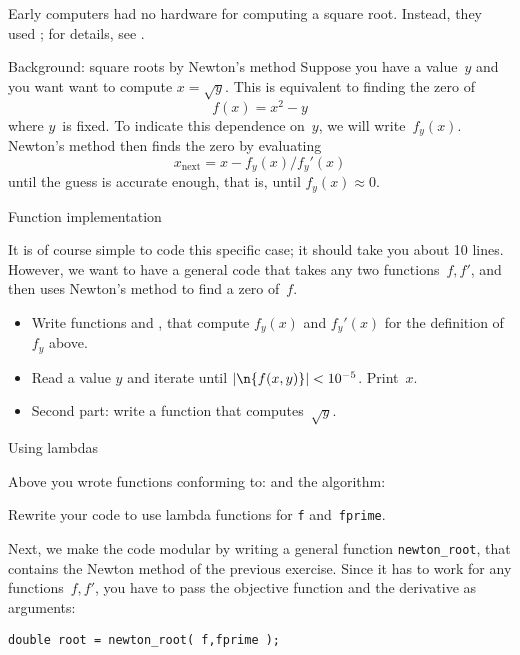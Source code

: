 Early computers had no hardware for computing a square
root. Instead, they used ;
for details, see .

\begin{block}{Background: square roots by Newton's method}
  \label{sl:newton-root}
  Suppose you
  have a value~$y$ and you want want to compute
  $x=\sqrt{y}$. This is equivalent to finding the zero of
  \[ f(x) = x^2-y \] where $y$~is fixed. To indicate this dependence
  on~$y$, we will write~$f_y(x)$. Newton's method then finds the zero by
  evaluating
  \[ x_{\mathrm{next}}=x-f_y(x)/f_y'(x) \]
  until the guess is accurate enough, that is, until $f_y(x)\approx0$.
\end{block}

 {Function implementation}

It is of course simple to code this specific case;
it should take you about 10 lines.
However, we want to have a general code
that takes any two functions~$f,f'$,
and then uses Newton's method to find a zero of~$f$.

\begin{exercise}
  \label{ex:newton-root}
  \begin{itemize}
  \item Write functions  and , that compute
    $f_y(x)$ and $f_y'(x)$ for the definition of $f_y$ above.
  \item Read a value $y$ and iterate until $|\n{f(x,y)}|<10^{-5}$. Print~$x$.
  \item Second part: write a function  that computes~$\sqrt{y}$.
  \end{itemize}
\end{exercise}

 {Using lambdas}

Above you wrote functions conforming to:
and the algorithm:

\begin{exercise}
  \label{ex:newton-functions}
  Rewrite your code to use lambda functions for \lstinline{f} and~\lstinline{fprime}.
\end{exercise}

Next, we make the code modular by 
writing a general function \lstinline+newton_root+,
that contains the Newton method of the previous exercise.
Since it has to work for any functions~$f,f'$,
you have to pass the objective function
and the derivative as arguments:
\begin{lstlisting}
double root = newton_root( f,fprime );
\end{lstlisting}

